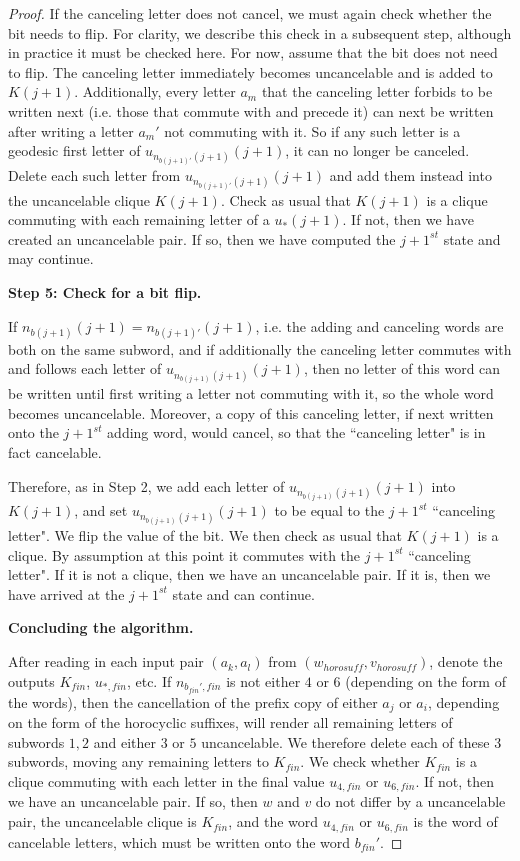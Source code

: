 \documentclass{amsart}
\theoremstyle{definition}
\theoremstyle{remark}
\begin{document}
\begin{proof}
		If the canceling letter does not cancel, we must again check whether the bit needs to flip. For clarity, we describe this check in a subsequent step, although in practice it must be checked here. For now, assume that the bit does not need to flip. The canceling letter immediately becomes uncancelable and is added to $K(j+1)$. Additionally, every letter $a_m$ that the canceling letter forbids to be written next (i.e. those that commute with and precede it) can next be written after writing a letter $a_m'$ not commuting with it. So if any such letter is a geodesic first letter of $u_{n_{b(j+1)'}(j+1)}(j+1)$, it can no longer be canceled. Delete each such letter from $u_{n_{b(j+1)'}(j+1)}(j+1)$ and add them instead into the uncancelable clique $K(j+1)$. Check as usual that $K(j+1)$ is a clique commuting with each remaining letter of a $u_{*}(j+1)$. If not, then we have created an uncancelable pair. If so, then we have computed the $j+1^{st}$ state and may continue.
		
		\textbf{Step 5: Check for a bit flip.}
		
		If $n_{b(j+1)}(j+1) = n_{b(j+1)'}(j+1)$, i.e. the adding and canceling words are both on the same subword, and if additionally the canceling letter commutes with and follows each letter of $u_{n_{b(j+1)}(j+1)}(j+1)$, then no letter of this word can be written until first writing a letter not commuting with it, so the whole word becomes uncancelable. Moreover, a copy of this canceling letter, if next written onto the $j+1^{st}$ adding word, would cancel, so that the ``canceling letter" is in fact cancelable.
		
		Therefore, as in Step 2, we add each letter of $u_{n_{b(j+1)}(j+1)}(j+1)$ into $K(j+1)$, and set $u_{n_{b(j+1)}(j+1)}(j+1)$ to be equal to the $j+1^{st}$ ``canceling letter". We flip the value of the bit. We then check as usual that $K(j+1)$ is a clique. By assumption at this point it commutes with the $j+1^{st}$ ``canceling letter". If it is not a clique, then we have an uncancelable pair. If it is, then we have arrived at the $j+1^{st}$ state and can continue. 
		
		\textbf{Concluding the algorithm.}
		
		After reading in each input pair $(a_k, a_l)$ from $(w_{horosuff}, v_{horosuff})$, denote the outputs $K_{fin}$, $u_{*, fin}$, etc. If $n_{b_{fin}', fin}$ is not either $4$ or $6$ (depending on the form of the words), then the cancellation of the prefix copy of either $a_j$ or $a_i$, depending on the form of the horocyclic suffixes, will render all remaining letters of subwords $1, 2$ and either $3$ or $5$ uncancelable. We therefore delete each of these $3$ subwords, moving any remaining letters to $K_{fin}$. We check whether $K_{fin}$ is a clique commuting with each letter in the final value $u_{4, fin}$ or $u_{6, fin}$. If not, then we have an uncancelable pair. If so, then $w$ and $v$ do not differ by a uncancelable pair, the uncancelable clique is $K_{fin}$, and the word $u_{4, fin}$ or $u_{6, fin}$ is the word of cancelable letters, which must be written onto the word $b_{fin}'$.
	\end{proof}
	
\end{document}
